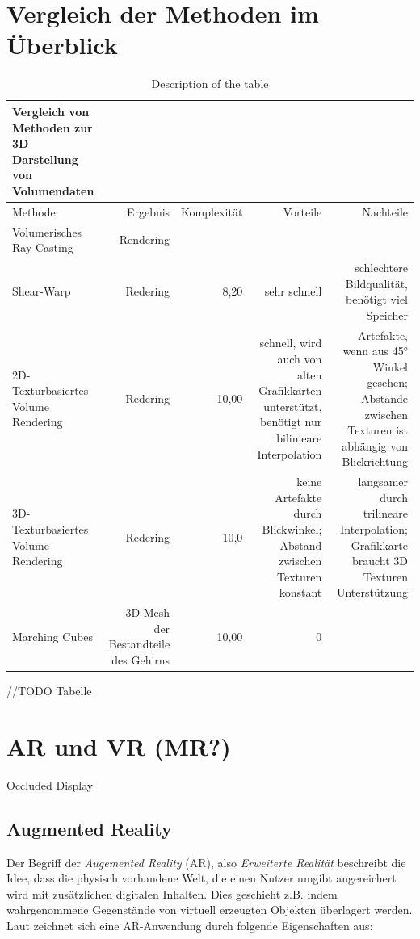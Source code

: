 \section{Vergleich der Methoden im Überblick}											 %
\begin{table}
\centering
\begin{tabular}{lrrrr}
\toprule
Vergleich von Methoden zur 3D Darstellung von Volumendaten\\  
\midrule 
Methode & Ergebnis & Komplexität & Vorteile & Nachteile \\ 
\midrule 
Volumerisches Ray-Casting & Rendering &  & & \\
Shear-Warp & Redering & 8,20 & sehr schnell& schlechtere Bildqualität, benötigt viel Speicher\\
2D-Texturbasiertes Volume Rendering & Redering  & 10,00 & schnell, wird auch von alten Grafikkarten unterstützt, benötigt nur bilinieare Interpolation & Artefakte, wenn aus 45° Winkel gesehen; Abstände zwischen Texturen ist abhängig von Blickrichtung \\ 
3D-Texturbasiertes Volume Rendering & Redering  & 10,0 & keine Artefakte durch Blickwinkel; Abstand zwischen Texturen konstant & langsamer durch trilineare Interpolation; Grafikkarte braucht 3D Texturen Unterstützung\\ 
Marching Cubes & 3D-Mesh der Bestandteile des Gehirns  & 10,00 & 0 &\\ 
\bottomrule
\end{tabular}
\caption{Description of the table}\label{volumeRenderingVergleich}
\end{table}

//TODO
Tabelle
\section{AR und VR (MR?)}									 %
Occluded Display 

\subsection{Augmented Reality}

Der Begriff der \textit{Augemented Reality} (AR), also \textit{Erweiterte Realität} beschreibt die Idee, dass die physisch vorhandene Welt, die einen Nutzer umgibt angereichert wird mit zusätzlichen digitalen Inhalten. Dies geschieht z.B. indem wahrgenommene Gegenstände von virtuell erzeugten Objekten überlagert werden. 
Laut \citet{azuma97} zeichnet sich eine AR-Anwendung durch folgende Eigenschaften aus:

